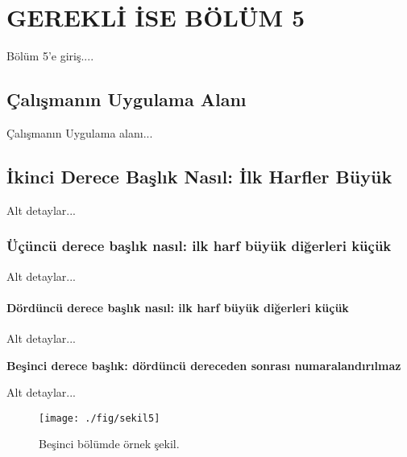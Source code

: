 \chapter{GEREKL\.I \.ISE B\"OL\"UM 5}\label{ch:ifnecch5}

Bölüm 5'e giriş....

\section{\c{C}al\i \c{s}man\i n Uygulama Alan{\i}}

Çalışmanın Uygulama alanı...

\section{\.Ikinci Derece Ba\c{s}l\i k Nas\i l: \.Ilk Harfler B\"uy\"uk}

Alt detaylar... 

\subsection{\"U\c{c}\"unc\"u derece ba\c{s}l\i k nas\i l: ilk harf b\"uy\"uk di\u{g}erleri k\"u\c{c}\"uk}

Alt detaylar... 

\subsubsection{D\"ord\"unc\"u derece ba\c{s}l\i k nas\i l: ilk harf b\"uy\"uk di\u{g}erleri k\"u\c{c}\"uk}

Alt detaylar... 

{\bf Be\c{s}inci derece ba\c{s}l\i k: d\"ord\"unc\"u dereceden sonras{\i} numaraland\i r\i lmaz}


Alt detaylar... 

\begin{figure}[b]
 \centering
 \texttt{[image: ./fig/sekil5]}
 \vspace*{3mm}
 \caption{Be\c{s}inci b\"ol\"umde \"ornek \c{s}ekil.}
 \label{fig:5-1}
\end{figure}

